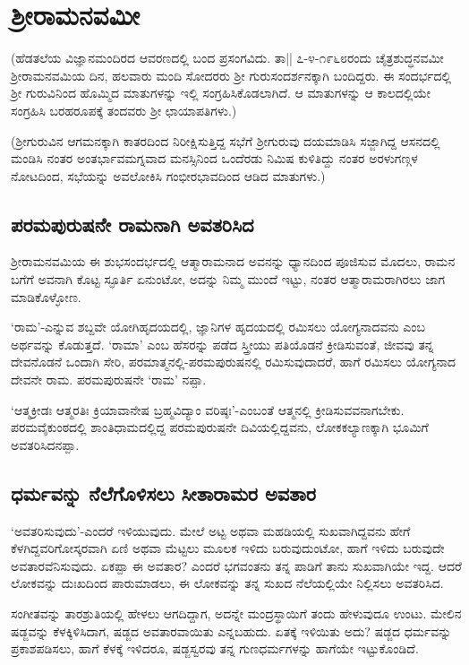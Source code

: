 \chapter{ಶ್ರೀರಾಮನವಮೀ} 

(ಹೆಡತಲೆಯ ವಿಜ್ಞಾನಮಂದಿರದ ಆವರಣದಲ್ಲಿ ಬಂದ ಪ್ರಸಂಗವಿದು. ತಾ|| ೭-೪-೧೯೬೮ರಂದು ಚೈತ್ರಶುದ್ಧನವಮೀ ಶ್ರೀರಾಮನವಮಿಯ ದಿನ, ಹಲವಾರು ಮಂದಿ ಸೋದರರು ಶ್ರೀ ಗುರುಸಂದರ್ಶನಕ್ಕಾಗಿ ಬಂದಿದ್ದರು. ಈ ಸಂದರ್ಭದಲ್ಲಿ ಶ್ರೀ ಗುರುವಿನಿಂದ ಹೊಮ್ಮಿದ ಮಾತುಗಳನ್ನು ಇಲ್ಲಿ ಸಂಗ್ರಹಿಸಿಕೊಡಲಾಗಿದೆ. ಆ ಮಾತುಗಳನ್ನು ಆ ಕಾಲದಲ್ಲಿಯೇ ಸಂಗ್ರಹಿಸಿ ಬರಹರೂಪಕ್ಕೆ ತಂದವರು ಶ್ರೀ ಛಾಯಾಪತಿಗಳು.) 

(ಶ್ರೀಗುರುವಿನ ಆಗಮನಕ್ಕಾಗಿ ಕಾತರದಿಂದ ನಿರೀಕ್ಷಿಸುತ್ತಿದ್ದ ಸಭೆಗೆ ಶ್ರೀಗುರುವು ದಯಮಾಡಿಸಿ ಸಜ್ಜಾಗಿದ್ದ ಆಸನದಲ್ಲಿ ಮಂಡಿಸಿ ನಂತರ ಅಂತರ್ಭಾವಮಗ್ನವಾದ ಮನಸ್ಸಿನಿಂದ ಒಂದೆರಡು ನಿಮಿಷ ಕುಳಿತಿದ್ದು ನಂತರ ಅರಳುಗಣ್ಗಳ ನೋಟದಿಂದ, ಸಭೆಯನ್ನು ಅವಲೋಕಿಸಿ ಗಂಭೀರಭಾವದಿಂದ ಆಡಿದ ಮಾತುಗಳು.) 

\section*{ಪರಮಪುರುಷನೇ ರಾಮನಾಗಿ ಅವತರಿಸಿದ}

ಶ್ರೀರಾಮನವಮಿಯ ಈ ಶುಭಸಂದರ್ಭದಲ್ಲಿ ಆತ್ಮಾರಾಮನಾದ ಅವನನ್ನು ಧ್ಯಾನದಿಂದ ಪೂಜಿಸುವ ಮೊದಲು, ರಾಮನ ಬಗೆಗೆ ಅವನಾಗಿ ಕೊಟ್ಟ ಸ್ಫೂರ್ತಿ ಏನುಂಟೋ, ಅದನ್ನು ನಿಮ್ಮ ಮುಂದೆ ಇಟ್ಟು, ನಂತರ ಆತ್ಮಾರಾಮರಾಗಿರಲು ಜಾಗ ಮಾಡಿಕೊಳ್ಳೋಣ. 

`ರಾಮ'-ಎನ್ನುವ ಶಬ್ದವೇ ಯೋಗಿಹೃದಯದಲ್ಲಿ, ಜ್ಞಾನಿಗಳ ಹೃದಯದಲ್ಲಿ ರಮಿಸಲು ಯೋಗ್ಯನಾದವನು ಎಂಬ ಅರ್ಥವನ್ನು ಕೊಡುತ್ತದೆ. `ರಾಮಾ' ಎಂಬ ಹೆಸರನ್ನು ಪಡೆದ ಸ್ತ್ರೀಯು ಪತಿಯೊಡನೆ ಕ್ರೀಡಿಸುವಂತೆ, ಜೀವವು ತನ್ನ ದೇವನೊಡನೆ ಒಂದಾಗಿ ಸೇರಿ, ಪರಮಾತ್ಮನಲ್ಲಿ-ಪರಮಪುರುಷನಲ್ಲಿ ರಮಿಸುವುದಾದರೆ, ಹಾಗೆ ರಮಿಸಲು ಯೋಗ್ಯನಾದ ದೇವನೇ ರಾಮ. ಪರಮಪುರುಷನೇ `ರಾಮ' ನಪ್ಪಾ. 

`ಆತ್ಮಕ್ರೀಡಃ ಆತ್ಮರತಿಃ\label{143} ಕ್ರಿಯಾವಾನೇಷ ಬ್ರಹ್ಮವಿದ್ಯಾಂ ವರಿಷ್ಠಃ'-ಎಂಬಂತೆ ಆತ್ಮನಲ್ಲಿ ಕ್ರೀಡಿಸುವವನಾಗಬೇಕು. ಪರಮವೈಕುಂಠದಲ್ಲಿ ಶಾಂತಿಧಾಮದಲ್ಲಿದ್ದ ಪರಮಪುರುಷನೇ ದಿವಿಯಲ್ಲಿದ್ದವನು, ಲೋಕಕಲ್ಯಾಣಕ್ಕಾಗಿ ಭೂಮಿಗೆ ಅವತರಿಸಿದನಪ್ಪಾ. 

\section*{ಧರ್ಮವನ್ನು ನೆಲೆಗೊಳಿಸಲು ಸೀತಾರಾಮರ ಅವತಾರ}

`ಅವತರಿಸುವುದು'-ಎಂದರೆ ಇಳಿಯುವುದು. ಮೇಲೆ ಅಟ್ಟ ಅಥವಾ ಮಹಡಿಯಲ್ಲಿ ಸುಖವಾಗಿದ್ದವನು ಹೇಗೆ ಕೆಳಗಿದ್ದವರಿಗೋಸ್ಕರವಾಗಿ ಏಣಿ ಅಥವಾ ಮೆಟ್ಟಲು ಮೂಲಕ ಇಳಿದು ಬರುವುದುಂಟೋ, ಹಾಗೆ ಇಳಿದು ಬರುವುದೇ ಅವತಾರವೆನಿಸುವುದು. ಏಕಪ್ಪಾ ಈ ಅವತಾರ? ಎಂದರೆ ಭಗವಂತನು ತನ್ನ ಪಾಡಿಗೆ ತಾನು ಸುಖವಾಗಿಯೇ ಇದ್ದ. ಆದರೆ ಲೋಕವನ್ನು ದುಃಖದಿಂದ ಪಾರುಮಾಡಲು, ಈ ಲೋಕವನ್ನು ತನ್ನ ಸುಖದ ನೆಲೆಯಲ್ಲಿಯೇ ನಿಲ್ಲಿಸಲು ಅವತರಿಸಿದ. 

ಸಂಗೀತವನ್ನು ತಾರಶ್ರುತಿಯಲ್ಲಿ ಹೇಳಲು ಆಗದಿದ್ದಾಗ, ಅದನ್ನೇ ಮಂದ್ರಸ್ಥಾಯಿಗೆ ತಂದು ಹೇಳುವುದೂ ಉಂಟು. ಮೇಲಿನ ಷಡ್ಜವನ್ನು ಕೆಳಕ್ಕಿಳಿಸಿದಾಗ, ಷಡ್ಜದ ಅವತಾರವಾಯಿತು ಎನ್ನಬಹುದು. ಏತಕ್ಕೆ ಇಳಿಯಿತು ಅದು? ಷಡ್ಜದ ಧರ್ಮವನ್ನು ಪ್ರಕಾಶಪಡಿಸಲು, ಹಾಗೆ ಕೆಳಕ್ಕೆ ಇಳಿದರೂ, ಷಡ್ಜಸ್ವರವು ತನ್ನ ಗುಣಧರ್ಮಗಳನ್ನು ಹಾಗೆಯೇ ಇಟ್ಟುಕೊಂಡಿದೆ. 

